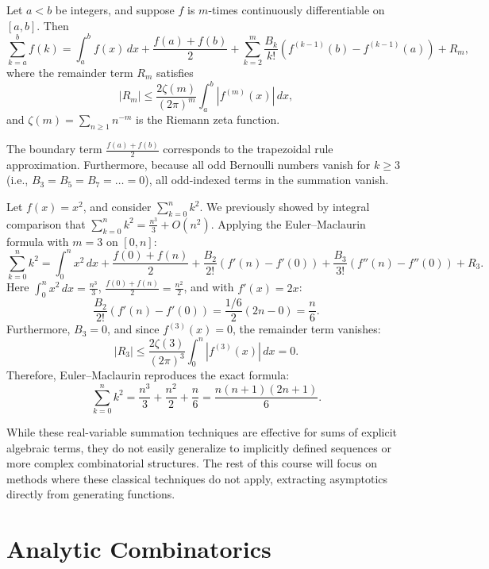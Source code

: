 \begin{theorem}
Let \(a < b\) be integers, and suppose \(f\) is \(m\)-times continuously differentiable on \([a, b]\).
Then
\[
    \sum_{k=a}^{b} f(k)
    = \int_{a}^{b} f(x) \, dx 
    + \frac{f(a) + f(b)}{2}
    + \sum_{k=2}^m \frac{B_k}{k!} \left( f^{(k-1)}(b) - f^{(k-1)}(a) \right)
    + R_m,
\]
where the remainder term \(R_m\) satisfies
\[
    |R_m| \le \frac{2 \zeta(m)}{(2\pi)^m} \int_{a}^{b} |f^{(m)}(x)| \, dx,
\]
and \(\zeta(m) = \sum_{n \ge 1} n^{-m}\) is the Riemann zeta function.
\end{theorem}

\begin{remark}
    The boundary term \(\frac{f(a) + f(b)}{2}\) corresponds to the trapezoidal rule approximation.
    Furthermore, because all odd Bernoulli numbers vanish for \(k \ge 3\) (i.e., \(B_3 = B_5 = B_7 = \dots = 0\)), all odd-indexed terms in the summation vanish.
\end{remark}

\begin{example}
    Let \(f(x) = x^2\), and consider \(\sum_{k=0}^{n} k^2\). We previously showed by integral comparison that \(\sum_{k=0}^{n} k^2 = \frac{n^3}{3} + O(n^2)\).
    Applying the Euler--Maclaurin formula with \(m=3\) on \([0, n]\):
    \[
        \sum_{k=0}^{n} k^2 = \int_0^n x^2 \, dx + \frac{f(0) + f(n)}{2} + \frac{B_2}{2!} (f'(n) - f'(0)) + \frac{B_3}{3!} (f''(n) - f''(0)) + R_3.
    \]
    Here \(\int_0^n x^2 \, dx = \frac{n^3}{3}\), \(\frac{f(0) + f(n)}{2} = \frac{n^2}{2}\), and with \(f'(x) = 2x\):
    \[
        \frac{B_2}{2!} (f'(n) - f'(0)) = \frac{1/6}{2} (2n - 0) = \frac{n}{6}.
    \]
    Furthermore, \(B_3 = 0\), and since \(f^{(3)}(x) = 0\), the remainder term vanishes:
    \[
        |R_3| \le \frac{2 \zeta(3)}{(2\pi)^3} \int_{0}^{n} |f^{(3)}(x)| \, dx = 0.
    \]
    Therefore, Euler--Maclaurin reproduces the exact formula:
    \[
        \sum_{k=0}^{n} k^2 = \frac{n^3}{3} + \frac{n^2}{2} + \frac{n}{6} = \frac{n(n+1)(2n+1)}{6}.
    \]
\end{example}

While these real-variable summation techniques are effective for sums of explicit algebraic terms, they do not easily generalize to implicitly defined sequences or more complex combinatorial structures.
The rest of this course will focus on methods where these classical techniques do not apply, extracting asymptotics directly from generating functions.

\section*{Analytic Combinatorics}

